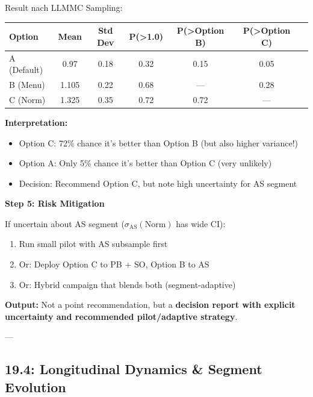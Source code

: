 Result nach LLMMC Sampling:

\begin{center}
\small
\renewcommand{\arraystretch}{1.3}
\begin{tabular}{@{}lcccccc@{}}
\toprule
\textbf{Option} & \textbf{Mean} & \textbf{Std Dev} & \textbf{P(>1.0)} & \textbf{P(>Option B)} & \textbf{P(>Option C)} \\
\midrule
A (Default) & 0.97 & 0.18 & 0.32 & 0.15 & 0.05 \\
B (Menu) & 1.105 & 0.22 & 0.68 & --- & 0.28 \\
C (Norm) & 1.325 & 0.35 & 0.72 & 0.72 & --- \\
\bottomrule
\end{tabular}
\end{center}

\textbf{Interpretation:}
\begin{itemize}[nosep]
\item Option C: 72\% chance it's better than Option B (but also higher variance!)
\item Option A: Only 5\% chance it's better than Option C (very unlikely)
\item Decision: Recommend Option C, but note high uncertainty for AS segment
\end{itemize}

\textbf{Step 5: Risk Mitigation}

If uncertain about AS segment ($\sigma_{\text{AS}}(\text{Norm})$ has wide CI):

\begin{enumerate}
\item Run small pilot with AS subsample first
\item Or: Deploy Option C to PB + SO, Option B to AS
\item Or: Hybrid campaign that blends both (segment-adaptive)
\end{enumerate}

\textbf{Output:} Not a point recommendation, but a \textbf{decision report with explicit uncertainty and recommended pilot/adaptive strategy}.

---

\subsection{19.4: Longitudinal Dynamics \& Segment Evolution}
\label{subsec:19-llmmc-longitudinal}

